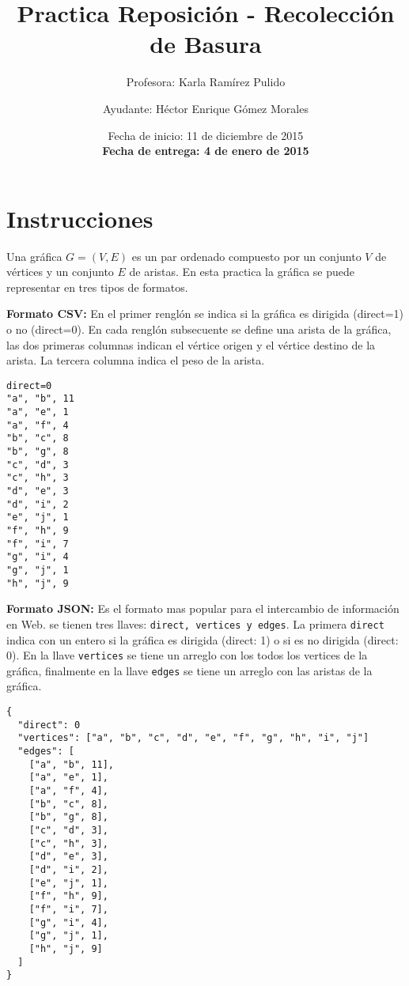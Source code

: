 \documentclass{article}
\author{Profesora: Karla Ramírez Pulido \and
  Ayudante: Héctor Enrique Gómez Morales}
\title{Practica Reposición - Recolección de Basura}
\date{Fecha de inicio: 11 de diciembre de 2015\\
  \textbf{Fecha de entrega: 4 de enero de 2015}}
\begin{document}
\maketitle
\section{Instrucciones}

Una gráfica $G = (V, E)$ es un par ordenado compuesto por un conjunto $V$ de vértices y un conjunto $E$ de aristas.
En esta practica la gráfica se puede representar en tres tipos de formatos.


\textbf{Formato CSV:} En el primer renglón se indica si la gráfica es dirigida (direct=1) o no (direct=0).
En cada renglón subsecuente se define una arista de la gráfica, las dos primeras columnas indican
el vértice origen y el vértice destino de la arista. La tercera columna indica el peso de la arista.

\begin{verbatim}
direct=0
"a", "b", 11
"a", "e", 1
"a", "f", 4
"b", "c", 8
"b", "g", 8
"c", "d", 3
"c", "h", 3
"d", "e", 3 
"d", "i", 2
"e", "j", 1
"f", "h", 9
"f", "i", 7
"g", "i", 4
"g", "j", 1
"h", "j", 9
\end{verbatim}


\textbf{Formato JSON:} Es el formato mas popular para el intercambio de información en Web. se tienen tres llaves: \texttt{direct, vertices y edges}. La primera \texttt{direct} indica con un entero si la gráfica es dirigida (direct: 1) o si es no dirigida (direct: 0). En la llave \texttt{vertices} se tiene un arreglo con los todos los vertices de la gráfica, finalmente en la llave \texttt{edges} se tiene un arreglo con las aristas de la gráfica. 

\begin{verbatim}
{
  "direct": 0
  "vertices": ["a", "b", "c", "d", "e", "f", "g", "h", "i", "j"]
  "edges": [
    ["a", "b", 11],
    ["a", "e", 1],
    ["a", "f", 4],
    ["b", "c", 8],
    ["b", "g", 8],
    ["c", "d", 3],
    ["c", "h", 3],
    ["d", "e", 3],
    ["d", "i", 2],
    ["e", "j", 1],
    ["f", "h", 9],
    ["f", "i", 7],
    ["g", "i", 4],
    ["g", "j", 1],
    ["h", "j", 9]
  ]
}
\end{verbatim}
\end{document}
